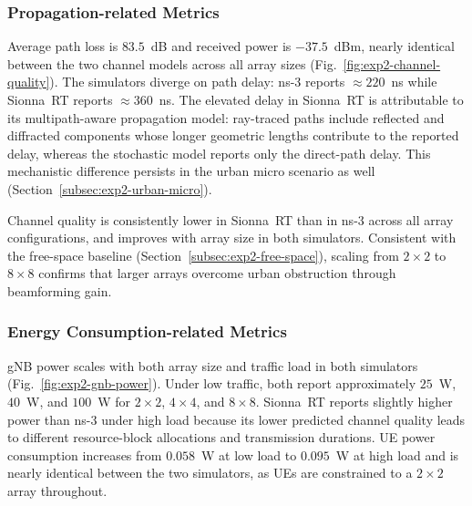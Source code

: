\subsubsection{Propagation-related Metrics}
\label{subsubsec:exp2-urban-macro-propagation}

Average path loss is $83.5$~dB and received power is $-37.5$~dBm, nearly identical between the two channel models across all array sizes (Fig.~\ref{fig:exp2-channel-quality}).
The simulators diverge on path delay: ns-3 reports $\approx220$~ns while Sionna~RT reports $\approx360$~ns.
The elevated delay in Sionna~RT is attributable to its multipath-aware propagation model: ray-traced paths include reflected and diffracted components whose longer geometric lengths contribute to the reported delay, whereas the stochastic model reports only the direct-path delay.
This mechanistic difference persists in the urban micro scenario as well (Section~\ref{subsec:exp2-urban-micro}).

Channel quality is consistently lower in Sionna~RT than in ns-3 across all array configurations, and improves with array size in both simulators.
Consistent with the free-space baseline (Section~\ref{subsec:exp2-free-space}), scaling from $2\times2$ to $8\times8$ confirms that larger arrays overcome urban obstruction through beamforming gain.

\subsubsection{Energy Consumption-related Metrics}
\label{subsubsec:exp2-urban-macro-energy}

gNB power scales with both array size and traffic load in both simulators (Fig.~\ref{fig:exp2-gnb-power}).
Under low traffic, both report approximately $25$~W, $40$~W, and $100$~W for $2\times2$, $4\times4$, and $8\times8$.
Sionna~RT reports slightly higher power than ns-3 under high load because its lower predicted channel quality leads to different resource-block allocations and transmission durations.
UE power consumption increases from $0.058$~W at low load to $0.095$~W at high load and is nearly identical between the two simulators, as UEs are constrained to a $2\times2$ array throughout.
